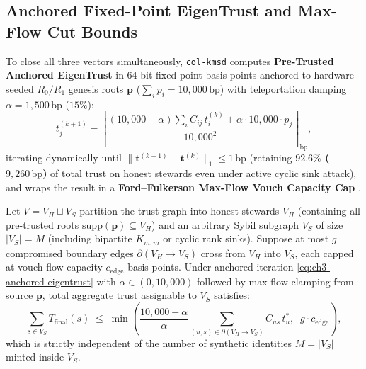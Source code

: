 \subsection{Anchored Fixed-Point EigenTrust and Max-Flow Cut Bounds}

To close all three vectors simultaneously, \texttt{col-kmsd} computes \textbf{Pre-Trusted Anchored
EigenTrust} in 64-bit fixed-point basis points anchored to hardware-seeded $R_0/R_1$ genesis
roots $\mathbf{p}$ ($\sum_i p_i = 10{,}000\,\mathrm{bp}$) with teleportation damping
$\alpha = 1{,}500\,\mathrm{bp}$ ($15\%$):
\begin{equation}
t_j^{(k+1)} = \left\lfloor \frac{(10{,}000 - \alpha) \sum_{i} C_{ij}\, t_i^{(k)} + \alpha \cdot 10{,}000 \cdot p_j}{10{,}000^2} \right\rfloor_{\mathrm{bp}},
\label{eq:ch3-anchored-eigentrust}
\end{equation}
iterating dynamically until $\|\mathbf{t}^{(k+1)} - \mathbf{t}^{(k)}\|_1 \le 1\,\mathrm{bp}$
(retaining \textbf{$92.6\%$ ($9{,}260\,\mathrm{bp}$)} of total trust on honest stewards even
under active cyclic sink attack), and wraps the result in a \textbf{Ford--Fulkerson Max-Flow Vouch
Capacity Cap} \parencite{ford1956maximal}.

\begin{theorem}
\label{thm:ch3-sybil-bound}
Let $V = V_H \sqcup V_S$ partition the trust graph into honest stewards $V_H$ (containing all
pre-trusted roots $\mathrm{supp}(\mathbf{p}) \subseteq V_H$) and an arbitrary Sybil subgraph
$V_S$ of size $|V_S| = M$ (including bipartite $K_{m,m}$ or cyclic rank sinks). Suppose at most
$g$ compromised boundary edges $\partial(V_H \to V_S)$ cross from $V_H$ into $V_S$, each capped
at vouch flow capacity $c_{\mathrm{edge}}$ basis points. Under anchored iteration
\eqref{eq:ch3-anchored-eigentrust} with $\alpha \in (0, 10{,}000)$ followed by max-flow clamping
from source $\mathbf{p}$, total aggregate trust assignable to $V_S$ satisfies:
\[
\sum_{s \in V_S} T_{\mathrm{final}}(s) \;\le\; \min\!\left(
    \frac{10{,}000 - \alpha}{\alpha} \sum_{(u,s) \in \partial(V_H \to V_S)} C_{us}\, t_u^*,\;\;
    g \cdot c_{\mathrm{edge}}
\right),
\]
which is strictly independent of the number of synthetic identities $M = |V_S|$ minted inside $V_S$.
\end{theorem}

